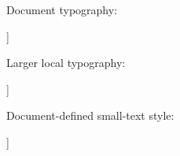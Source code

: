 \documentclass[12pt]{article}
\begin{document}
Document typography:
\begin{fittedterminaltree}[ROOT [alpha] [beta] [gamma]]\end{fittedterminaltree}
\begingroup
\Large
Larger local typography:
\begin{fittedterminaltree}[ROOT [alpha] [beta] [gamma]]\end{fittedterminaltree}
\endgroup
\begingroup
\renewcommand{\footnotesize}{\fontsize{9.5}{11}\selectfont}
Document-defined small-text style:
\begin{fittedterminaltree}[ROOT [alpha] [beta] [gamma]]\end{fittedterminaltree}
\endgroup
\end{document}
